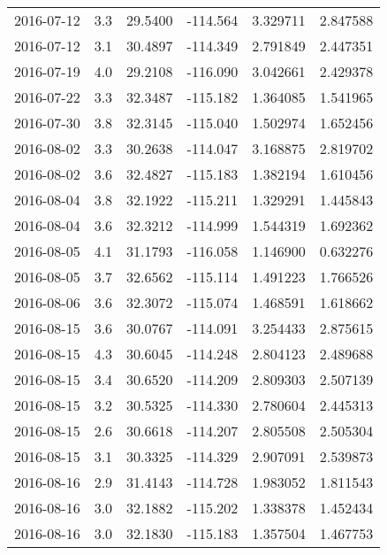 \begin{tabular}{lrrrrr}
2016-07-12 &       3.3 &  29.5400 &  -114.564 &         3.329711 &         2.847588 \\
2016-07-12 &       3.1 &  30.4897 &  -114.349 &         2.791849 &         2.447351 \\
2016-07-19 &       4.0 &  29.2108 &  -116.090 &         3.042661 &         2.429378 \\
2016-07-22 &       3.3 &  32.3487 &  -115.182 &         1.364085 &         1.541965 \\
2016-07-30 &       3.8 &  32.3145 &  -115.040 &         1.502974 &         1.652456 \\
2016-08-02 &       3.3 &  30.2638 &  -114.047 &         3.168875 &         2.819702 \\
2016-08-02 &       3.6 &  32.4827 &  -115.183 &         1.382194 &         1.610456 \\
2016-08-04 &       3.8 &  32.1922 &  -115.211 &         1.329291 &         1.445843 \\
2016-08-04 &       3.6 &  32.3212 &  -114.999 &         1.544319 &         1.692362 \\
2016-08-05 &       4.1 &  31.1793 &  -116.058 &         1.146900 &         0.632276 \\
2016-08-05 &       3.7 &  32.6562 &  -115.114 &         1.491223 &         1.766526 \\
2016-08-06 &       3.6 &  32.3072 &  -115.074 &         1.468591 &         1.618662 \\
2016-08-15 &       3.6 &  30.0767 &  -114.091 &         3.254433 &         2.875615 \\
2016-08-15 &       4.3 &  30.6045 &  -114.248 &         2.804123 &         2.489688 \\
2016-08-15 &       3.4 &  30.6520 &  -114.209 &         2.809303 &         2.507139 \\
2016-08-15 &       3.2 &  30.5325 &  -114.330 &         2.780604 &         2.445313 \\
2016-08-15 &       2.6 &  30.6618 &  -114.207 &         2.805508 &         2.505304 \\
2016-08-15 &       3.1 &  30.3325 &  -114.329 &         2.907091 &         2.539873 \\
2016-08-16 &       2.9 &  31.4143 &  -114.728 &         1.983052 &         1.811543 \\
2016-08-16 &       3.0 &  32.1882 &  -115.202 &         1.338378 &         1.452434 \\
2016-08-16 &       3.0 &  32.1830 &  -115.183 &         1.357504 &         1.467753 \\

\end{tabular}
